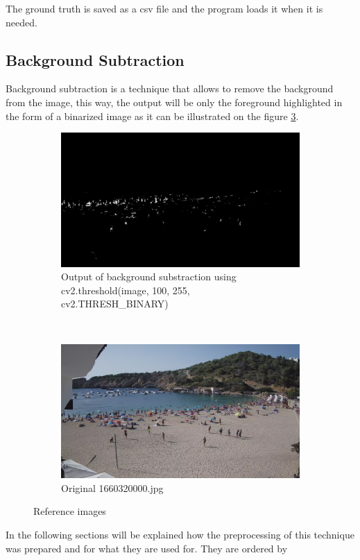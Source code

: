 \documentclass[10pt]{article}
\begin{document}
The ground truth is saved as a csv file and the program loads it when it is needed.

\subsection{Background Subtraction}
Background subtraction is a technique that allows to remove the background from the image, this way, the output will be only the foreground highlighted in the form of a binarized image as it can be illustrated on the figure \ref{fig: img_reference}.

\begin{figure}[h]
  \begin{subfigure}[t]{0.5\textwidth}
    \centering
    \includegraphics[width=\textwidth]{img/bin_ex.jpg}
    \caption{Output of background substraction using cv2.threshold(image, 100, 255, cv2.THRESH\_BINARY)}
    \label{fig:y equals x}
  \end{subfigure}
  ~
  \begin{subfigure}[t]{0.5\textwidth}
    \centering
    \includegraphics[width=\textwidth]{img/or_ex.jpg}
    \caption{Original 1660320000.jpg}
    \label{fig:y equals x}
  \end{subfigure}

  \caption{Reference images}
  \label{fig: img_reference}
\end{figure}
\FloatBarrier
In the following sections will be explained how the preprocessing of this technique was prepared and for what they are used for. They are ordered by
\end{document}

